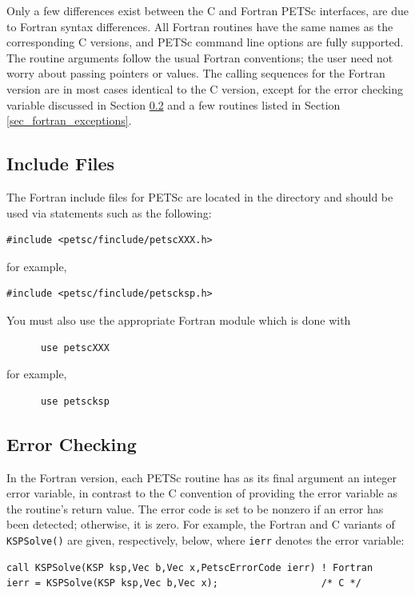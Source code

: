 Only a few differences exist between the C and Fortran PETSc
interfaces, are due to Fortran syntax differences.
All Fortran routines have the same names as the corresponding C
versions, and PETSc command line options are fully supported. The
routine arguments follow the usual Fortran conventions; the user need
not worry about passing pointers or values.  The calling sequences
for the Fortran version are in most cases identical to the C version,
except for the error checking variable discussed in
Section \ref{sec_fortran_errors} and a few routines listed in
Section \ref{sec_fortran_exceptions}.

\subsection{Include Files}
\label{sec_fortran_includes}

The Fortran include files for PETSc are located in the directory
 and should be used via statements
such as the following:
\begin{lstlisting}
#include <petsc/finclude/petscXXX.h>
\end{lstlisting}
for example,
\begin{lstlisting}
#include <petsc/finclude/petscksp.h>
\end{lstlisting}
You must also use the appropriate Fortran module which is done with
\begin{lstlisting}
      use petscXXX
\end{lstlisting}
for example,
\begin{lstlisting}
      use petscksp
\end{lstlisting}

\subsection{Error Checking}
\label{sec_fortran_errors}

In the Fortran version, each PETSc routine has as its final argument
an integer error variable, in contrast to the C convention of
providing the error variable as the routine's return value.  The error
code is set to be nonzero if an error has been detected; otherwise, it
is zero.  For example, the Fortran and C variants of \lstinline{KSPSolve()} are
given, respectively, below, where \lstinline{ierr} denotes the error variable:
\begin{lstlisting}
call KSPSolve(KSP ksp,Vec b,Vec x,PetscErrorCode ierr) ! Fortran
ierr = KSPSolve(KSP ksp,Vec b,Vec x);                  /* C */
\end{lstlisting}

